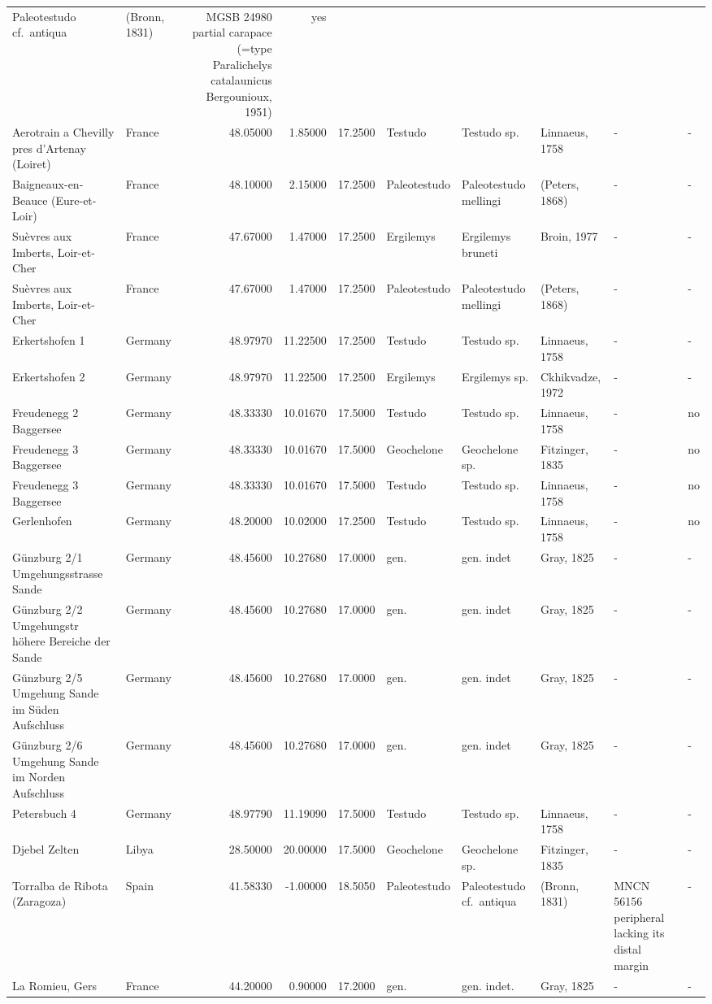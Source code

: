 \documentclass[]{article}
\begin{document}
\begin{longtable}[]{@{}llrrrlllll@{}}
Paleotestudo cf.~antiqua & (Bronn, 1831) & MGSB 24980 partial carapace
(=type Paralichelys catalaunicus Bergounioux, 1951) & yes\tabularnewline
Aerotrain a Chevilly pres d'Artenay (Loiret) & France & 48.05000 &
1.85000 & 17.2500 & Testudo & Testudo sp. & Linnaeus, 1758 & - &
-\tabularnewline
Baigneaux-en-Beauce (Eure-et-Loir) & France & 48.10000 & 2.15000 &
17.2500 & Paleotestudo & Paleotestudo mellingi & (Peters, 1868) & - &
-\tabularnewline
Suèvres aux Imberts, Loir-et-Cher & France & 47.67000 & 1.47000 &
17.2500 & Ergilemys & Ergilemys bruneti & Broin, 1977 & - &
-\tabularnewline
Suèvres aux Imberts, Loir-et-Cher & France & 47.67000 & 1.47000 &
17.2500 & Paleotestudo & Paleotestudo mellingi & (Peters, 1868) & - &
-\tabularnewline
Erkertshofen 1 & Germany & 48.97970 & 11.22500 & 17.2500 & Testudo &
Testudo sp. & Linnaeus, 1758 & - & -\tabularnewline
Erkertshofen 2 & Germany & 48.97970 & 11.22500 & 17.2500 & Ergilemys &
Ergilemys sp. & Ckhikvadze, 1972 & - & -\tabularnewline
Freudenegg 2 Baggersee & Germany & 48.33330 & 10.01670 & 17.5000 &
Testudo & Testudo sp. & Linnaeus, 1758 & - & no\tabularnewline
Freudenegg 3 Baggersee & Germany & 48.33330 & 10.01670 & 17.5000 &
Geochelone & Geochelone sp. & Fitzinger, 1835 & - & no\tabularnewline
Freudenegg 3 Baggersee & Germany & 48.33330 & 10.01670 & 17.5000 &
Testudo & Testudo sp. & Linnaeus, 1758 & - & no\tabularnewline
Gerlenhofen & Germany & 48.20000 & 10.02000 & 17.2500 & Testudo &
Testudo sp. & Linnaeus, 1758 & - & no\tabularnewline
Günzburg 2/1 Umgehungsstrasse Sande & Germany & 48.45600 & 10.27680 &
17.0000 & gen. & gen. indet & Gray, 1825 & - & -\tabularnewline
Günzburg 2/2 Umgehungstr höhere Bereiche der Sande & Germany & 48.45600
& 10.27680 & 17.0000 & gen. & gen. indet & Gray, 1825 & - &
-\tabularnewline
Günzburg 2/5 Umgehung Sande im Süden Aufschluss & Germany & 48.45600 &
10.27680 & 17.0000 & gen. & gen. indet & Gray, 1825 & - &
-\tabularnewline
Günzburg 2/6 Umgehung Sande im Norden Aufschluss & Germany & 48.45600 &
10.27680 & 17.0000 & gen. & gen. indet & Gray, 1825 & - &
-\tabularnewline
Petersbuch 4 & Germany & 48.97790 & 11.19090 & 17.5000 & Testudo &
Testudo sp. & Linnaeus, 1758 & - & -\tabularnewline
Djebel Zelten & Libya & 28.50000 & 20.00000 & 17.5000 & Geochelone &
Geochelone sp. & Fitzinger, 1835 & - & -\tabularnewline
Torralba de Ribota (Zaragoza) & Spain & 41.58330 & -1.00000 & 18.5050 &
Paleotestudo & Paleotestudo cf.~antiqua & (Bronn, 1831) & MNCN 56156
peripheral lacking its distal margin & -\tabularnewline
La Romieu, Gers & France & 44.20000 & 0.90000 & 17.2000 & gen. & gen.
indet. & Gray, 1825 & - & -\tabularnewline

\end{longtable}
\end{document}
